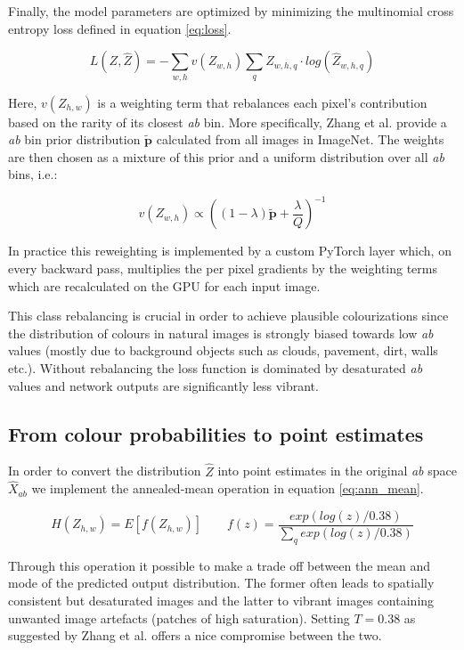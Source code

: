 \documentclass{article}
\begin{document}
Finally, the model parameters are optimized by minimizing the multinomial
cross entropy loss defined in equation \ref{eq:loss}.

\begin{equation}
L(Z, \hat{Z}) = -\sum_{w,h} v(Z_{w,h}) \sum_q Z_{w,h,q} \cdot log(\hat{Z}_{w,h,q})
\label{eq:loss}
\end{equation}

Here, $v(Z_{h,w})$ is a weighting term that rebalances each pixel's
contribution based on the rarity of its closest \textit{ab} bin. More
specifically, Zhang et al. provide a \textit{ab} bin prior distribution
$\tilde{\bm{p}}$ calculated from all images in ImageNet. The weights are then
chosen as a mixture of this prior and a uniform distribution over all
\textit{ab} bins, i.e.:

\begin{equation}
v(Z_{w,h}) \propto \left((1 - \lambda) \tilde{\bm{p}} + \frac{\lambda}{Q} \right)^{-1}
\label{eq:rebal}
\end{equation}

In practice this reweighting is implemented by a custom PyTorch layer which,
on every backward pass, multiplies the per pixel gradients by the weighting
terms which are recalculated on the GPU for each input image.

This class rebalancing is crucial in order to achieve plausible colourizations
since the distribution of colours in natural images is strongly biased towards
low \textit{ab} values (mostly due to background objects such as clouds,
pavement, dirt, walls etc.). Without rebalancing the loss function is dominated
by desaturated \textit{ab} values and network outputs are significantly less
vibrant.


\subsection{From colour probabilities to point estimates}

In order to convert the distribution $\hat{Z}$ into point estimates in
the original \textit{ab} space $\hat{X}_{ab}$ we implement the annealed-mean
operation in equation \ref{eq:ann_mean}.

\begin{equation}
H(Z_{h,w}) = E[f(Z_{h,w})] \qquad f(z) = \frac{exp(log(z)/0.38)}{\sum_q exp(log(z)/0.38)}
\label{eq:ann_mean}
\end{equation}

Through this operation it possible to make a trade off between the mean and
mode of the predicted output distribution. The former often leads to spatially
consistent but desaturated images and the latter to vibrant images containing
unwanted image artefacts (patches of high saturation).  Setting $T = 0.38$ as
suggested by Zhang et al. offers a nice compromise between the two.
\end{document}
